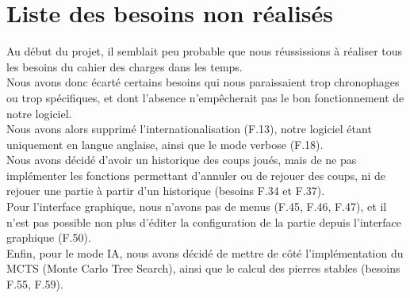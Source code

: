 \documentclass[a4paper,12pt]{article}
\begin{document}
\vspace{1cm}

\newpage

\section{Liste des besoins non réalisés}

Au début du projet, il semblait peu probable que nous réussissions à réaliser
tous les besoins du cahier des charges dans les temps.\\ Nous avons donc écarté
certains besoins qui nous paraissaient trop chronophages ou trop spécifiques,
et dont l’absence n'empêcherait pas le bon fonctionnement de notre logiciel.\\
Nous avons alors supprimé l’internationalisation (F.13), notre logiciel étant
uniquement en langue anglaise, ainsi que le mode verbose (F.18).\\ Nous avons
décidé d'avoir un historique des coups joués, mais de ne pas implémenter les
fonctions permettant d’annuler ou de rejouer des coups, ni de rejouer une
partie à partir d’un historique (besoins F.34 et F.37).\\ Pour l'interface
graphique, nous n’avons pas de menus (F.45, F.46, F.47), et il n’est pas
possible non plus d’éditer la configuration de la partie depuis l’interface
graphique (F.50).\\ Enfin, pour le mode IA, nous avons décidé de mettre de côté
l’implémentation du MCTS (Monte Carlo Tree Search), ainsi que le calcul des
pierres stables (besoins F.55, F.59).\\
\end{document}
